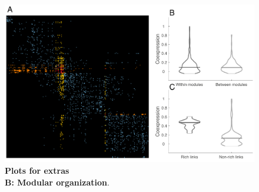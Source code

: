 \documentclass[10pt,letterpaper]{article}
\begin{document}
\begin{figure}[!h]
\centering
    \includegraphics[width=1\textwidth]{Modules.pdf}
 \caption{{\bf Plots for extras}\\
\textbf{B: Modular organization}.
}
 \label{Modules}
 \end{figure}
\end{document}
